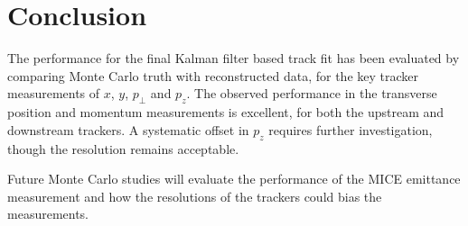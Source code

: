 \section{Conclusion}
\label{sec:Conclusion}

The performance for the final Kalman filter based track fit has been evaluated by comparing Monte Carlo truth with reconstructed data, for the key tracker measurements of $x$, $y$, $p_{\perp}$ and $p_z$.  The observed performance in the transverse position and momentum measurements is excellent, for both the upstream and downstream trackers. A systematic offset in $p_z$ requires further investigation, though the resolution remains acceptable.

Future Monte Carlo studies will evaluate the performance of the MICE emittance measurement and how the resolutions of the trackers could bias the measurements.
